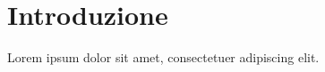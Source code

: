 
\cleardoublepage
{}
\chapter*{Introduzione}\label{cap:intro}


\lipsum[1]

Lorem ipsum dolor sit amet, consectetuer adipiscing elit.

